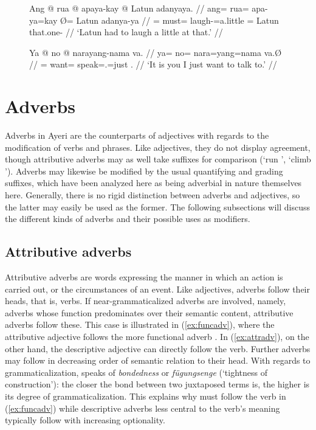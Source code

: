 \begin{figure}[h]
\pex\label{ex:intsfvb}
\a\label{ex:verbquant}\begingl
	\gla Ang @ rua @ apaya-kay {} @ Latun adanyaya. //
	\glb ang= rua= apa-ya=kay Ø= Latun adanya-ya //
	\glc \AgtT{}= must= laugh-\TsgM{}=a.little \Top{}= Latun that.one-\Loc{} //
	\glft `Latun had to laugh a little at that.' //
\endgl

\a\begingl
	\gla Ya @ no @ narayang-nama va. //
	\glb ya= no= nara=yang=nama va.Ø //
	\glc \LocT{}= want= speak=\Fsg{}.\Aarg{}=just \Second{}.\Top{} //
	\glft `It is you I just want to talk to.' //
\endgl
\xe
\end{figure}


\section{Adverbs}
\label{sec:adverbs}

Adverbs in Ayeri are the counterparts of adjectives with regards to the
modification of verbs and phrases. Like adjectives, they do not display
agreement, though attributive adverbs may as well take suffixes for comparison
(`run ', `climb '). Adverbs may likewise be modified by
the usual quantifying and grading suffixes, which have been analyzed here as
being adverbial in nature themselves here. Generally, there is no rigid
distinction between adverbs and adjectives, so the latter may easily be used as
the former. The following subsections will discuss the different kinds of
adverbs and their possible uses as modifiers.

\subsection{Attributive adverbs}

Attributive adverbs are words expressing the manner in which an action is
carried out, or the circumstances of an event. Like adjectives, adverbs follow
their heads, that is, verbs. If near-grammaticalized adverbs are involved,
namely, adverbs whose function predominates over their semantic content,
attributive adverbs follow these. This case is illustrated in
(\ref{ex:funcadv}), where the attributive adjective 
follows the more functional adverb . In
(\ref{ex:attradv}), on the other hand, the descriptive adjective
 can directly follow the verb. Further adverbs may
follow in decreasing order of semantic relation to their head. With regards to
grammaticalization, \citet[157\psqq]{lehmann2015} speaks of \emph{bondedness}
or \emph{fügungsenge} (`tightness of construction'): the closer the bond
between two juxtaposed terms is, the higher is its degree of
grammaticalization. This explains why  must follow the verb in
(\ref{ex:funcadv}) while descriptive adverbs less central to the verb's meaning
typically follow with increasing optionality.

